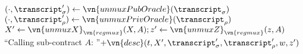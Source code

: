 \begin{algorithmic}
    \State \Let $(\cdot, \transcript_\sigma') \gets
      \vn{unmuxPubOracle}(\transcript_\sigma)$
    \State \Let $(\cdot, \transcript_\rho') \gets
      \vn{unmuxPrivOracle}(\transcript_\rho)$
    \State \Let $X' \gets \vn{unmuxX}_{\vn{regmux}}(X, A); z' \gets
      \vn{unmuxZ}_{\vn{regmux}}(z, A)$
    \State \Return ``Calling sub-contract $A$: ''$+ \vn{desc}(t, X',
      \transcript_\sigma', \transcript_\rho', w, z')$
  \EndFunction
\end{algorithmic}
